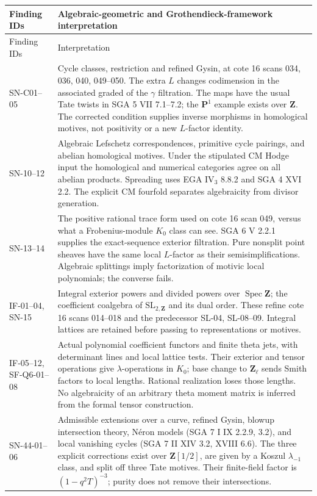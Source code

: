 \documentclass[11pt,a4paper]{article}
\theoremstyle{definition}
\theoremstyle{remark}
\begin{document}
\begin{longtable}{@{}p{}p{}@{}}
\toprule
Finding IDs & Algebraic-geometric and Grothendieck-framework interpretation\\
\midrule
\endfirsthead
\toprule Finding IDs & Interpretation\\\midrule
\endhead
SN-C01--05 &
Cycle classes, restriction and refined Gysin, at cote 16
scans 034, 036, 040, 049--050.
The extra $L$ changes codimension in the associated graded of
the $\gamma$ filtration. The maps have the usual Tate twists
in SGA 5 VII 7.1--7.2; the $\mathbf P^1$ example exists over
$\mathbf Z$. The corrected condition supplies inverse morphisms
in homological motives, not positivity or a new $L$-factor identity.\\
SN-10--12 &
Algebraic Lefschetz correspondences, primitive cycle pairings,
and abelian homological motives. Under the stipulated CM Hodge
input the homological and numerical categories agree on all
abelian products. Spreading uses EGA IV$_3$ 8.8.2 and
SGA 4 XVI 2.2. The explicit CM fourfold separates algebraicity
from divisor generation.\\
SN-13--14 &
The positive rational trace form used on cote 16 scan 049,
versus what a Frobenius-module $K_0$ class can see.
SGA 6 V 2.2.1 supplies the exact-sequence exterior filtration.
Pure nonsplit point sheaves have the same local $L$-factor
as their semisimplifications. Algebraic splittings imply
factorization of motivic local polynomials; the converse fails.\\
IF-01--04, SN-15 &
Integral exterior powers and divided powers over
$\operatorname{Spec}\mathbf Z$; the coefficient coalgebra
of $\mathrm{SL}_{2,\mathbf Z}$ and its dual order.
These refine cote 16 scans 014--018 and the predecessor
SL-04, SL-08--09. Integral lattices are retained before
passing to representations or motives.\\
IF-05--12, SF-Q6-01--08 &
Actual polynomial coefficient functors and finite theta jets,
with determinant lines and local lattice tests. Their exterior
and tensor operations give $\lambda$-operations in $K_0$;
base change to $\mathbf Z_\ell$ sends Smith factors to local
lengths. Rational realization loses those lengths.
No algebraicity of an arbitrary theta moment matrix is
inferred from the formal tensor construction.\\
SN-44-01--06 &
Admissible extensions over a curve, refined Gysin, blowup
intersection theory, N\'eron models (SGA 7 I IX 2.2.9, 3.2),
and local vanishing cycles (SGA 7 II XIV 3.2, XVIII 6.6).
The three explicit corrections exist over $\mathbf Z[1/2]$,
are given by a Koszul $\lambda_{-1}$ class, and split off
three Tate motives. Their finite-field factor is
$(1-q^2T)^{-3}$; purity does not remove their intersections.\\
\bottomrule
\end{longtable}
\end{document}
